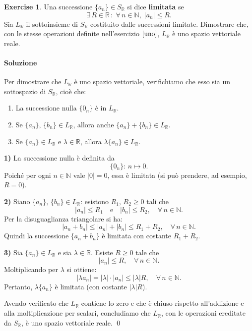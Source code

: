 \documentclass{article}
\theoremstyle{plain}
\theoremstyle{definition}
\newtheorem{xca}[exmp]{Exercise}
\theoremstyle{remark}
\begin{document}
\vspace{10pt}

\begin{bxthm}
\begin{xca}
    Una successione $\{a_n\}\in S_\mathbb{R}$ si dice \textbf{limitata} se 
    \[\exists\, R\in\mathbb{R}\,:\;\forall\,n\in\mathbb{N},\;|a_n|\leq R.\]
    Sia $L_\mathbb{R}$ il sottoinsieme di $S_\mathbb{R}$ costituito dalle successioni limitate. 
    Dimostrare che, con le stesse operazioni definite nell'esercizio $\ref{uno}$, $L_\mathbb{R}$ è uno spazio vettoriale reale.
\end{xca}
\end{bxthm}
\paragraph{Soluzione}
Per dimostrare che $L_\mathbb{R}$ è uno spazio vettoriale, verifichiamo che esso sia un sottospazio di $S_\mathbb{R}$, cioè che:
\begin{enumerate}
    \item La successione nulla $\{0_n\}$ è in $L_\mathbb{R}$.
    \item Se $\{a_n\},\,\{b_n\}\in L_\mathbb{R}$, allora anche $\{a_n\}+\{b_n\}\in L_\mathbb{R}$.
    \item Se $\{a_n\}\in L_\mathbb{R}$ e $\lambda\in\mathbb{R}$, allora $\lambda\{a_n\}\in L_\mathbb{R}$.
\end{enumerate}

\textbf{1)} La successione nulla è definita da
\[
\{0_n\}:\,n\mapsto 0.
\]
Poiché per ogni $n\in\mathbb{N}$ vale $|0|=0$, essa è limitata (si può prendere, ad esempio, $R=0$).

\textbf{2)} Siano $\{a_n\},\,\{b_n\}\in L_\mathbb{R}$: esistono $R_1,\,R_2\ge 0$ tali che
\[
|a_n|\le R_1\quad\text{e}\quad |b_n|\le R_2,\quad\forall\,n\in\mathbb{N}.
\]
Per la disuguaglianza triangolare si ha:
\[
|a_n+b_n|\le |a_n|+|b_n|\le R_1+R_2,\quad\forall\,n\in\mathbb{N}.
\]
Quindi la successione $\{a_n+b_n\}$ è limitata con costante $R_1+R_2$.

\textbf{3)} Sia $\{a_n\}\in L_\mathbb{R}$ e sia $\lambda\in\mathbb{R}$. Esiste $R\ge 0$ tale che 
\[
|a_n|\le R,\quad\forall\,n\in\mathbb{N}.
\]
Moltiplicando per $\lambda$ si ottiene:
\[
|\lambda a_n|=|\lambda|\cdot |a_n|\le |\lambda|R,\quad\forall\,n\in\mathbb{N}.
\]
Pertanto, $\lambda\{a_n\}$ è limitata (con costante $|\lambda|R$).

Avendo verificato che $L_\mathbb{R}$ contiene lo zero e che è chiuso rispetto all'addizione e alla moltiplicazione per scalari, concludiamo che $L_\mathbb{R}$, con le operazioni ereditate da $S_\mathbb{R}$, è uno spazio vettoriale reale. \qed
\end{document}

